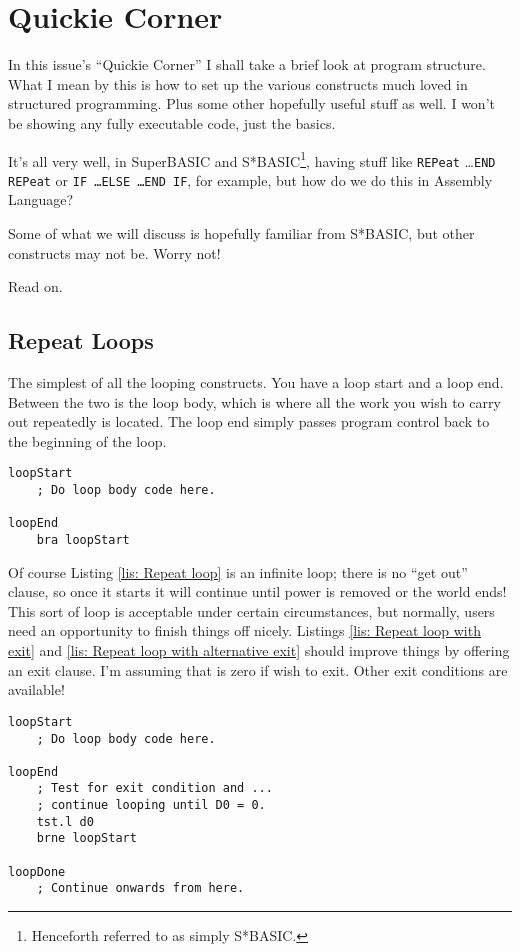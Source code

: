
\chapter{Quickie Corner}

In this issue's ``Quickie Corner'' I shall take a brief look at program structure. What I mean by this is how to set up the various constructs much loved in structured programming. Plus some other hopefully useful stuff as well. I won't be showing any fully executable code, just the basics.

It's all very well, in SuperBASIC and S*BASIC\footnote{Henceforth referred to as simply S*BASIC.}, having stuff like \texttt{REPeat} \ldots \texttt{END REPeat} or \texttt{IF \ldots ELSE \ldots END IF}, for example, but how do we do this in Assembly Language? 

Some of what we will discuss is hopefully familiar from S*BASIC, but other constructs may not be. Worry not!

Read on.

\section{Repeat Loops}

The simplest of all the looping constructs. You have a loop start and a loop end. Between the two is the loop body, which is where all the work you wish to carry out repeatedly is located. The loop end simply passes program control back to the beginning of the loop.

\begin{lstlisting}[caption={Repeat loops in Assembly Code},label={lis: Repeat loop}]
loopStart
    ; Do loop body code here.

loopEnd
    bra loopStart
\end{lstlisting}

Of course Listing \ref{lis: Repeat loop} is an infinite loop; there is no ``get out'' clause, so once it starts it will continue until power is removed or the world ends! This sort of loop is acceptable under certain circumstances, but normally, users need an opportunity to finish things off nicely. Listings \ref{lis: Repeat loop with exit} and \ref{lis: Repeat loop with alternative exit} should improve things by offering an exit clause. I'm assuming that  is zero if wish to exit. Other exit conditions are available!

\begin{lstlisting}[caption={Repeat loops with exit in Assembly Code},label={lis: Repeat loop with exit}]
loopStart
    ; Do loop body code here.
    
loopEnd
    ; Test for exit condition and ...
    ; continue looping until D0 = 0.
    tst.l d0   
    brne loopStart
    
loopDone
    ; Continue onwards from here.
\end{lstlisting}

